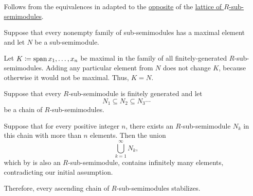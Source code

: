 \begin{defproof}
   Follows from the equivalences in  adapted to the \hyperref[def:semilattice/duality]{opposite} of the \hyperref[thm:substructures_form_complete_lattice]{lattice of \( R \)-sub-semimodules}.

   Suppose that every nonempty family of sub-semimodules has a maximal element and let \( N \) be a sub-semimodule.

  Let \( K \coloneqq \operatorname{span}{ x_1, \ldots, x_n } \) be maximal in the family of all finitely-generated \( R \)-sub-semimodules. Adding any particular element from \( N \) does not change \( K \), because otherwise it would not be maximal. Thus, \( K = N \).

   Suppose that every \( R \)-sub-semimodule is finitely generated and let
  \begin{equation*}
    N_1 \subseteq N_2 \subseteq N_3 \cdots
  \end{equation*}
  be a chain of \( R \)-sub-semimodules.

  Suppose that for every positive integer \( n \), there exists an \( R \)-sub-semimodule \( N_k \) in this chain with more than \( n \) elements. Then the union
  \begin{equation*}
    \bigcup_{k=1}^\infty N_k,
  \end{equation*}
  which by  is also an \( R \)-sub-semimodule, contains infinitely many elements, contradicting our initial assumption.

  Therefore, every ascending chain of \( R \)-sub-semimodules stabilizes.
\end{defproof}

